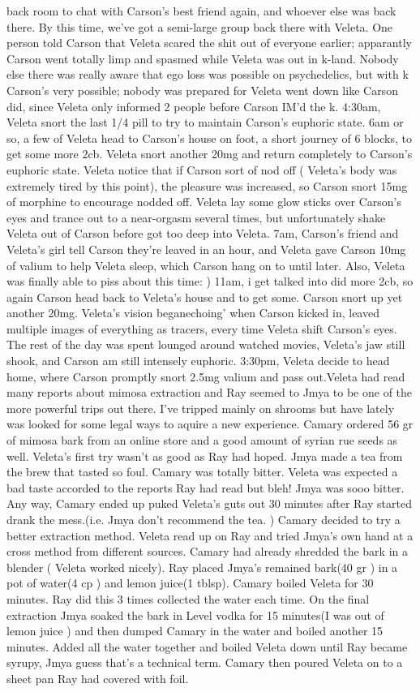 \documentclass[12pt]{book}
\begin{document}
back room to chat with Carson's best friend again, and whoever else was back there. By this time, we've got a semi-large group back there with Veleta. One person told Carson that Veleta scared the shit out of everyone earlier; apparantly Carson went totally limp and spasmed while Veleta was out in k-land. Nobody else there was really aware that ego loss was possible on psychedelics, but with k Carson's very possible; nobody was prepared for Veleta went down like Carson did, since Veleta only informed 2 people before Carson IM'd the k. 4:30am, Veleta snort the last 1/4 pill to try to maintain Carson's euphoric state. 6am or so, a few of Veleta head to Carson's house on foot, a short journey of 6 blocks, to get some more 2cb. Veleta snort another 20mg and return completely to Carson's euphoric state. Veleta notice that if Carson sort of nod off ( Veleta's body was extremely tired by this point), the pleasure was increased, so Carson snort 15mg of morphine to encourage nodded off. Veleta lay some glow sticks over Carson's eyes and trance out to a near-orgasm several times, but unfortunately shake Veleta out of Carson before got too deep into Veleta. 7am, Carson's friend and Veleta's girl tell Carson they're leaved in an hour, and Veleta gave Carson 10mg of valium to help Veleta sleep, which Carson hang on to until later. Also, Veleta was finally able to piss about this time: ) 11am, i get talked into did more 2cb, so again Carson head back to Veleta's house and to get some. Carson snort up yet another 20mg. Veleta's vision beganechoing' when Carson kicked in, leaved multiple images of everything as tracers, every time Veleta shift Carson's eyes. The rest of the day was spent lounged around watched movies, Veleta's jaw still shook, and Carson am still intensely euphoric. 3:30pm, Veleta decide to head home, where Carson promptly snort 2.5mg valium and pass out.Veleta had read many reports about mimosa extraction and Ray seemed to Jmya to be one of the more powerful trips out there. I've tripped mainly on shrooms but have lately was looked for some legal ways to aquire a new experience. Camary ordered 56 gr of mimosa bark from an online store and a good amount of syrian rue seeds as well. Veleta's first try wasn't as good as Ray had hoped. Jmya made a tea from the brew that tasted so foul. Camary was totally bitter. Veleta was expected a bad taste accorded to the reports Ray had read but bleh! Jmya was sooo bitter. Any way, Camary ended up puked Veleta's guts out 30 minutes after Ray started drank the mess.(i.e. Jmya don't recommend the tea. ) Camary decided to try a better extraction method. Veleta read up on Ray and tried Jmya's own hand at a cross method from different sources. Camary had already shredded the bark in a blender ( Veleta worked nicely). Ray placed Jmya's remained bark(40 gr ) in a pot of water(4 cp ) and lemon juice(1 tblsp). Camary boiled Veleta for 30 minutes. Ray did this 3 times collected the water each time. On the final extraction Jmya soaked the bark in Level vodka for 15 minutes(I was out of lemon juice ) and then dumped Camary in the water and boiled another 15 minutes. Added all the water together and boiled Veleta down until Ray became syrupy, Jmya guess that's a technical term. Camary then poured Veleta on to a sheet pan Ray had covered with foil. 
\end{document}
